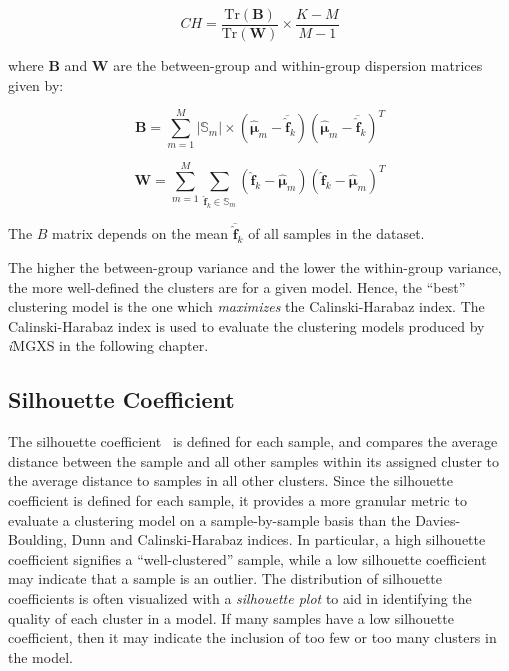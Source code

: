 \begin{equation}
\label{eqn:chap10-ch-index}
CH = \frac{\mathrm{Tr}(\boldsymbol{B})}{\mathrm{Tr}(\boldsymbol{W})} \times \frac{K-M}{M-1}
\end{equation}

\noindent where $\boldsymbol{B}$ and $\boldsymbol{W}$ are the between-group and within-group dispersion matrices given by:

\begin{equation}
\label{eqn:chap10-ch-index-between-group-disp}
\boldsymbol{B} = \displaystyle\sum\limits_{m=1}^{M} |\mathbb{S}_{m}| \times \left(\boldsymbol{\hat{\mu}}_{m} - \overline{\boldsymbol{\hat{f}}}_{k}\right)\left(\boldsymbol{\hat{\mu}}_{m} - \overline{\boldsymbol{\hat{f}}}_{k}\right)^{T}
\end{equation}

\begin{equation}
\label{eqn:chap10-ch-index-within-group-disp}
\boldsymbol{W} = \displaystyle\sum\limits_{m=1}^{M} \displaystyle\sum\limits_{\boldsymbol{\hat{f}}_{k} \in \mathbb{S}_{m}} \left(\boldsymbol{\hat{f}}_{k} - \boldsymbol{\hat{\mu}}_{m}\right)\left(\boldsymbol{\hat{f}}_{k} - \boldsymbol{\hat{\mu}}_{m}\right)^{T}
\end{equation}

\noindent The $B$ matrix depends on the mean $\overline{\boldsymbol{\hat{f}}}_{k}$ of all samples in the dataset.

The higher the between-group variance and the lower the within-group variance, the more well-defined the clusters are for a given model. Hence, the ``best'' clustering model is the one which \textit{maximizes} the Calinski-Harabaz index. The Calinski-Harabaz index is used to evaluate the clustering models produced by \textit{i}\ac{MGXS} in the following chapter.


\subsection{Silhouette Coefficient}
\label{subsec:chap10-silhouette-coeff}

The silhouette coefficient~\cite{rousseeuw1987silhouette} is defined for each sample, and compares the average distance between the sample and all other samples within its assigned cluster to the average distance to samples in all other clusters. Since the silhouette coefficient is defined for each sample, it provides a more granular metric to evaluate a clustering model on a sample-by-sample basis than the Davies-Boulding, Dunn and Calinski-Harabaz indices. In particular, a high silhouette coefficient signifies a ``well-clustered'' sample, while a low silhouette coefficient may indicate that a sample is an outlier. The distribution of silhouette coefficients is often visualized with a \textit{silhouette plot} to aid in identifying the quality of each cluster in a model. If many samples have a low silhouette coefficient, then it may indicate the inclusion of too few or too many clusters in the model.

